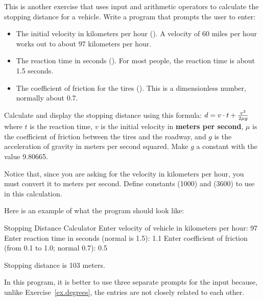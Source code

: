 \begin{exercise}
\label{brakingDistance}

This is another exercise that uses input and arithmetic operators to calculate the stopping distance for a vehicle. Write a program that prompts the user to enter:

\begin{itemize}

\item The initial velocity in kilometers per hour (). A velocity of 60 miles per hour works out to about 97 kilometers per hour.
\item The reaction time in seconds (). For most people, the reaction time is about 1.5 seconds.
\item The coefficient of friction for the tires (). This is a dimensionless number, normally about 0.7.

\end{itemize}

Calculate and display the stopping distance using this formula:
$d = v \cdot t + {v^2 \over {2 \mu g}}$
where $t$ is the reaction time, $v$ is the initial velocity in {\bf meters per second}, $\mu$ is the coefficient of friction between the tires and the roadway, and $g$ is the acceleration of gravity in meters per second squared. Make $g$ a constant with the value 9.80665.

Notice that, since you are asking for the velocity in kilometers per hour, you must convert it to meters per second. Define constants  (1000) and  (3600) to use in this calculation.

Here is an example of what the program should look like:

\begin{stdout}
Stopping Distance Calculator
Enter velocity of vehicle in kilometers per hour: 97
Enter reaction time in seconds (normal is 1.5): 1.1
Enter coefficient of friction (from 0.1 to 1.0; normal 0.7): 0.5

Stopping distance is 103 meters.
\end{stdout}

In this program, it is better to use three separate prompts for the input because, unlike Exercise~\ref{ex.degrees}, the entries are not closely related to each other.
 
\end{exercise}

